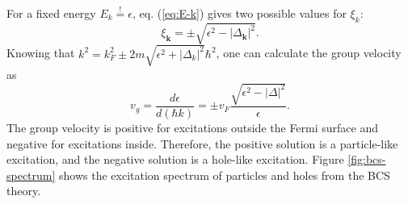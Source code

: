 For a fixed energy $E_k \stackrel{!}{=} \epsilon $, eq. (\ref{eq:E-k}) gives two possible values for $\xi_k$:
\begin{equation}
\xi_\mathbf{k} = \pm \sqrt{\epsilon^2 - | \Delta_\mathbf{k}|^2}.
\end{equation}
Knowing that $k^2 = k_F^2 \pm 2m\sqrt{\epsilon^2 + |\Delta_k|^2} \hbar^2$, one can calculate the group velocity as 
\begin{equation}
v_g = \frac{d \epsilon}{d (\hbar k)} = \pm v_F \frac{\sqrt{\epsilon^2 - |\Delta|^2}}{\epsilon}.
\end{equation}
The group velocity is positive for excitations outside the Fermi surface and negative for excitations inside. Therefore, the positive solution is a particle-like excitation, and the negative solution is a hole-like excitation. Figure \ref{fig:bcs-spectrum} shows the excitation spectrum of particles and holes from the BCS theory. 


